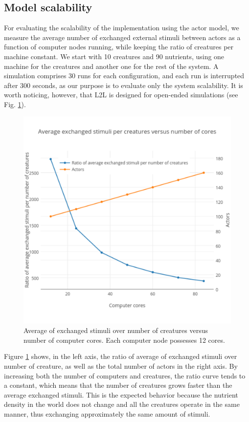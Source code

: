 \documentclass[runningheads]{llncs}
\begin{document}
\subsection{Model scalability}

For evaluating the scalability of the implementation using the actor model, we measure the average number of exchanged external stimuli between actors as a function of computer nodes running, while keeping the ratio of creatures per machine constant. We start with 10 creatures and 90 nutrients, using one machine for the creatures and another one for the rest of the system. A simulation comprises 30 runs for each configuration, and each run is interrupted after 300 seconds, as our purpose is to evaluate only the  system scalability. It is worth noticing, however, that L2L is designed for open-ended simulations (see  Fig. \ref{inferno}). 

\begin{figure}
	\centering
	\includegraphics[scale=0.35]{images/ratioCreature}
	\caption{Average of exchanged stimuli over number of creatures versus number of computer cores. Each computer node possesses 12 cores.}
	\label{inferno}
\end{figure}

Figure \ref{inferno} shows, in the left axis, the ratio of average of exchanged stimuli over number of creature, as well as the total number of actors in the right axis. By increasing both the number of computers and creatures, the ratio curve tends to a constant, which means that the number of creatures grows faster than the average exchanged stimuli. This is the expected behavior because the nutrient density in the world does not change and all the creatures operate in the same manner, thus exchanging approximately the same amount of stimuli.
\end{document}
